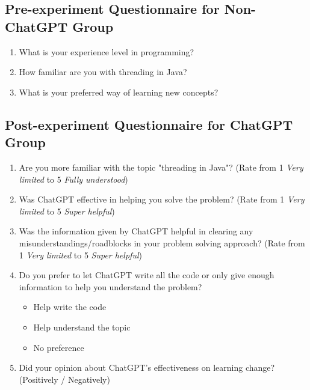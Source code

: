 \documentclass[manuscript,screen,nonacm]{acmart}
\begin{document}
\begin{appendices}
\subsection{Pre-experiment Questionnaire for Non-ChatGPT Group}\label{NONChatGPTpre}
\begin{enumerate}
    \item What is your experience level in programming? 
    \item How familiar are you with threading in Java?
    \item What is your preferred way of learning new concepts?
\end{enumerate}

\subsection{Post-experiment Questionnaire for ChatGPT Group}\label{ChatGPTpost}
\begin{enumerate}
    \item Are you more familiar with the topic "threading in Java"? (Rate from 1 \textit{Very limited} to 5 \textit{Fully understood})
    \item Was ChatGPT effective in helping you solve the problem? (Rate from 1 \textit{Very limited} to 5 \textit{Super helpful})
    \item Was the information given by ChatGPT helpful in clearing any misunderstandings/roadblocks in your problem solving approach? (Rate from 1 \textit{Very limited} to 5 \textit{Super helpful})
    \item Do you prefer to let ChatGPT write all the code or only give enough information to help you understand the problem?
        \begin{itemize}
            \item Help write the code
            \item Help understand the topic
            \item No preference
        \end{itemize}
    \item Did your opinion about ChatGPT's effectiveness on learning change? (Positively / Negatively)
\end{enumerate}


\end{appendices}
\end{document}
